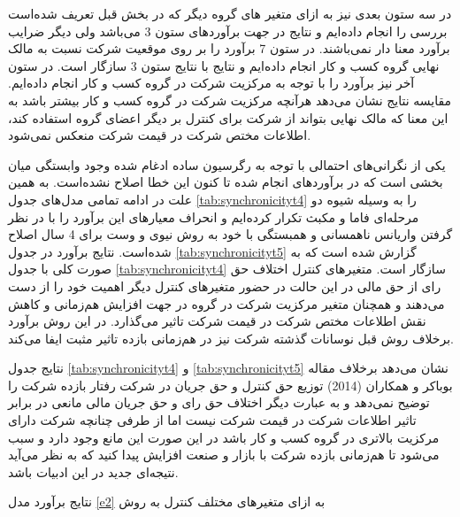 \documentclass[12pt, a4paper]{article}
\begin{document}
در سه ستون بعدی نیز به ازای متغیر های گروه دیگر که در بخش قبل تعریف شده‌است بررسی را انجام داده‌ایم و نتایج در جهت برآورد‌های ستون 3 می‌باشد ولی دیگر ضرایب برآورد معنا دار نمی‌باشند. در ستون 7 برآورد را بر روی موقعیت شرکت نسبت به مالک نهایی گروه کسب و کار انجام داده‌ایم و نتایج با نتایج ستون 3 سازگار است. در ستون آخر نیز برآورد را با توجه به مرکزیت شرکت در گروه کسب و کار انجام داده‌ایم. مقایسه نتایج نشان می‌دهد هرآنچه مرکزیت شرکت در گروه کسب و کار بیشتر باشد به این معنا که مالک نهایی بتواند از شرکت برای کنترل بر دیگر اعضای گروه استفاده کند، اطلاعات مختص شرکت در قیمت شرکت منعکس نمی‌شود.

یکی از نگرانی‌های احتمالی با توجه به 
رگرسیون ساده ادغام شده 
وجود وابستگی میان بخشی است که در برآورد‌های انجام شده تا کنون این خطا اصلاح نشده‌است. به همین علت در ادامه تمامی مدل‌های جدول
\ref{tab:synchronicityt4}
را به وسیله شیوه دو مرحله‌ای 
فاما و مکبث 
	تکرار کرده‌ایم و انحراف معیار‌های این برآورد را با در نظر گرفتن واریانس ناهمسانی و همبستگی با خود 
	به روش نیوی و وست
	برای 4 سال اصلاح شده‌است. نتایج برآورد در جدول 
	\ref{tab:synchronicityt5}
	گزارش شده است که به صورت کلی با جدول 
	\ref{tab:synchronicityt4} 
	سازگار است. متغیر‌های کنترل اختلاف حق‌ رای از حق مالی  در این حالت در حضور متغیر‌های کنترل دیگر اهمیت خود را از دست می‌دهند و همچنان متغیر مرکزیت شرکت در گروه در جهت افزایش هم‌زمانی و کاهش نقش اطلاعات مختص شرکت در قیمت شرکت  تاثیر می‌گذارد. در این روش  برآورد برخلاف روش قبل نوسانات گذشته شرکت نیز در هم‌زمانی بازده تاثیر مثبت ایفا می‌کند.

نتایج جدول 
\ref{tab:synchronicityt4} 
و
\ref{tab:synchronicityt5} 
نشان می‌دهد برخلاف مقاله بوباکر و همکاران  (2014)
توزیع حق کنترل و حق جریان در شرکت رفتار بازده شرکت را توضیح نمی‌دهد و به عبارت دیگر اختلاف حق رای و حق جریان مالی مانعی در برابر تاثیر اطلاعات شرکت در قیمت شرکت نیست اما از طرفی چنانچه شرکت دارای مرکزیت بالاتری در گروه کسب و کار باشد در این صورت این مانع وجود دارد و سبب می‌شود تا هم‌زمانی بازده شرکت با بازار و صنعت افزایش پیدا کنید که به نظر می‌آید نتیجه‌ای جدید در این ادبیات باشد. 



				\begin{table}[htbp]
	\centering
	\caption{نتایج برآورد مدل \ref{e2}
	به ازای متغیر‌های مختلف کنترل به روش 
}
	\resizebox{0.7\textheight}{!}{
\lr{		
		\label{tab:synchronicityt4}	
	}
}
\end{table}
\end{document}
